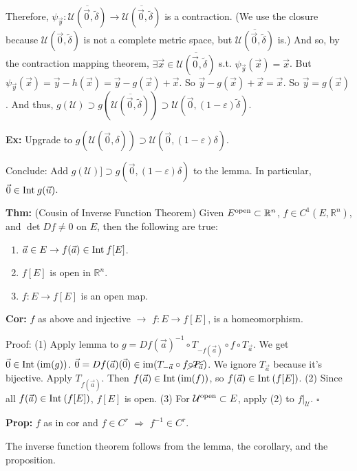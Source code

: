 \documentclass[10pt,letterpaper]{article}
\newcommand{\n}{\hfill\break}
\newcommand{\thm}[1]{\par\noindent\settowidth{\hangindent}{\textbf{Thm: }}\textbf{Thm: }#1\n}
\newcommand{\prop}[1]{\par\noindent\settowidth{\hangindent}{\textbf{Prop: }}\textbf{Prop: }#1\n}
\newcommand{\cor}[1]{\par\noindent\settowidth{\hangindent}{\textbf{Cor: }}\textbf{Cor: }#1\n}
\newcommand{\ex}[1]{\par\noindent\settowidth{\hangindent}{\textbf{Ex: }}\textbf{Ex: }#1\n}
\newcommand{\proven}{\;$\square$\n}
\newcommand{\ptxt}[1]{\textrm{\textnormal{#1}}}
\newcommand{\reals}{\mathbb{R}}
\newcommand{\R}{\reals}
\newcommand{\inv}{^{-1}}
\newcommand{\of}{\circ}
\renewcommand{\epsilon}{\varepsilon}
\newcommand{\im}{\textrm{\textnormal{im}}}
\newcommand{\closure}[1]{\overline{#1}}
\newcommand{\uball}{\mathcal{U}}
\newcommand{\Int}{\ptxt{Int}\>}
\newcommand{\st}{s.t.}
\begin{document}
\par\noindent Therefore, $\psi_{\vec{y}}:\closure{\uball(\vec{0},\widetilde{\delta})}\to\closure{\uball(\vec{0},\widetilde{\delta})}$ is a contraction. (We use the closure because $\uball(\vec{0},\widetilde{\delta})$ is not a complete metric space, but $\closure{\uball(\vec{0},\widetilde{\delta})}$ is.)\n
And so, by the contraction mapping theorem, $\exists\vec{x}\in\closure{\uball(\vec{0},\widetilde{\delta})}$ \st{} $\psi_{\vec{y}}(\vec{x})=\vec{x}$. But $\psi_{\vec{y}}(\vec{x})=\vec{y}-h(\vec{x})=\vec{y}-g(\vec{x})+\vec{x}$. So $\vec{y}-g(\vec{x})+\vec{x}=\vec{x}$. So $\vec{y}=g(\vec{x})$. And thus, $g(\uball)\supset{}g(\closure{\uball(\vec{0},\widetilde{\delta})})\supset\uball(\vec{0},(1-\epsilon)\widetilde{\delta})$.\n

\ex{Upgrade to $g(\uball(\vec{0},\delta))\supset\uball(\vec{0},(1-\epsilon)\delta)$.}

\par\noindent Conclude: Add $g(\uball)]\supset{}g(\vec{0},(1-\epsilon)\delta)$ to the lemma. In particular, $\vec{0}\in\Int{}g(\vec{u})$.\n

\newpage
\thm{(Cousin of Inverse Function Theorem) Given $E^{\ptxt{open}}\subset\R^{n}$, $f\in{}C^{1}(E,\R^{n})$, and $\det{}Df\ne{}0$ on $E$, then the following are true:
\begin{enumerate}
	\item $\vec{a}\in{}E\to{}f(\vec{a})\in\Int{}f[E]$.
	\item $f[E]$ is open in $\R^{n}$.
	\item $f:E\to{}f[E]$ is an open map.
\end{enumerate}}

\cor{$f$ as above and injective $\to$ $f:E\to{}f[E]$, is a homeomorphism.}

\par\noindent Proof:\n
(1) Apply lemma to $g=Df(\vec{a})\inv\of{}T_{-f(\vec{a})}\of{}f\of{}T_{\vec{a}}$. We get $\vec{0}\in\Int(\im(g))$. $\vec{0}=Df(\vec{a})(\vec{0})\in\im(T_{-\vec{a}}\of{}f\cancel{\of{}T_{\vec{a}}})$. We ignore $T_{\vec{a}}$ because it's bijective.\n
Apply $T_{f(\vec{a})}$. Then $f(\vec{a})\in\Int(\im(f))$, so $f(\vec{a})\in\Int(f[E])$.\n
(2) Since all $f(\vec{a})\in\Int(f[E])$, $f[E]$ is open.\n
(3) For $\uball^{\ptxt{open}}\subset{}E$, apply (2) to $f|_{\uball}$.\n
\proven

\prop{$f$ as in cor and $f\in{}C^{r}$ $\Rightarrow$ $f\inv\in{}C^{r}$.}

\par\noindent The inverse function theorem follows from the lemma, the corollary, and the proposition.\n
\end{document}
